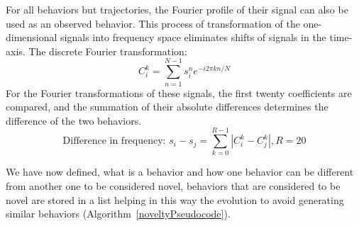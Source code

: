For all behaviors but trajectories, the Fourier profile of their signal can also be used as an observed behavior. This process of transformation of the one-dimensional signals into frequency space eliminates shifts of signals in the time-axis. The discrete Fourier transformation:
\begin{equation}
C_i^k = \sum_{n=1}^{N-1} s_i^n e^{-i 2 \pi k n/N}
\end{equation}
For the Fourier transformations of these signals, the first twenty coefficients are compared, and the summation of their absolute differences determines the difference of the two behaviors.
\begin{equation}
\text{Difference in frequency: } s_i - s_j = \sum_{k=0}^{R-1} | C_i^k - C_j^k |, R=20
\end{equation}

We have now defined, what is a behavior and how one behavior can be different from another one to be considered novel, behaviors that are considered to be novel are stored in a list helping in this way the evolution to avoid generating similar behaviors (Algorithm~\ref{noveltyPseudocode}).
